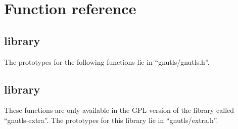 \chapter{Function reference}

\section{\gnutls{} library}
The prototypes for the following functions lie
in ``gnutls/gnutls.h''.


\newpage


\section{\gnutlse{} library}
These functions are only available in the GPL version of the
library called ``gnutls-extra''. The prototypes for this library lie
in ``gnutls/extra.h''.



